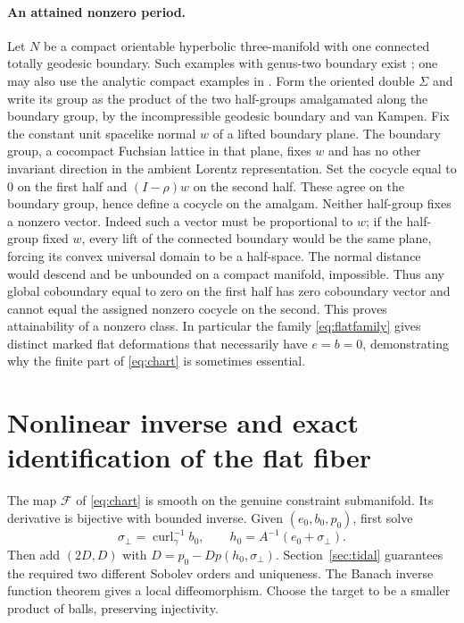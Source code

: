 \documentclass[11pt]{article}
\theoremstyle{remark}
\newcommand{\Curl}{\operatorname{curl}}
\newcommand{\F}{\mathcal F}
\begin{document}
\paragraph{An attained nonzero period.}
Let \(N\) be a compact orientable hyperbolic three-manifold with one connected totally geodesic boundary. Such examples with genus-two boundary exist \cite{FMP}; one may also use the analytic compact examples in \cite{KM}. Form the oriented double \(\Sigma\) and write its group as the product of the two half-groups amalgamated along the boundary group, by the incompressible geodesic boundary and van Kampen. Fix the constant unit spacelike normal \(w\) of a lifted boundary plane. The boundary group, a cocompact Fuchsian lattice in that plane, fixes \(w\) and has no other invariant direction in the ambient Lorentz representation. Set the cocycle equal to \(0\) on the first half and \((I-\rho)w\) on the second half. These agree on the boundary group, hence define a cocycle on the amalgam. Neither half-group fixes a nonzero vector. Indeed such a vector must be proportional to \(w\); if the half-group fixed \(w\), every lift of the connected boundary would be the same plane, forcing its convex universal domain to be a half-space. The normal distance would descend and be unbounded on a compact manifold, impossible. Thus any global coboundary equal to zero on the first half has zero coboundary vector and cannot equal the assigned nonzero cocycle on the second. This proves attainability of a nonzero class. In particular the family \eqref{eq:flatfamily} gives distinct marked flat deformations that necessarily have \(e=b=0\), demonstrating why the finite part of \eqref{eq:chart} is sometimes essential.

\section{Nonlinear inverse and exact identification of the flat fiber}\label{sec:inverse}

The map \(\F\) of \eqref{eq:chart} is smooth on the genuine constraint submanifold. Its derivative is bijective with bounded inverse. Given \((e_0,b_0,p_0)\), first solve
\[
 \sigma_\perp=\Curl_\gamma^{-1}b_0,\qquad
 h_0=A^{-1}(e_0+\sigma_\perp).
\]
Then add \((2D,D)\) with \(D=p_0-Dp(h_0,\sigma_\perp)\). Section~\ref{sec:tidal} guarantees the required two different Sobolev orders and uniqueness. The Banach inverse function theorem gives a local diffeomorphism. Choose the target to be a smaller product of balls, preserving injectivity.
\end{document}
